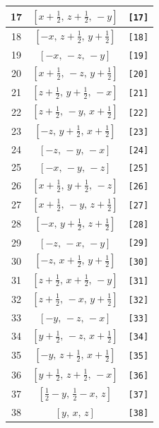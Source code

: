 \documentclass[fleqn,8pt]{jsarticle}
\begin{document}
\begin{longtable}{ccc}
17 & $\left[ x + \frac{1}{2},\, z + \frac{1}{2},\, - y \right]$ & {\tt [17]} \\ \hline
18 & $\left[ - x,\, z + \frac{1}{2},\, y + \frac{1}{2} \right]$ & {\tt [18]} \\ \hline
19 & $\left[ - x,\, - z,\, - y \right]$ & {\tt [19]} \\ \hline
20 & $\left[ x + \frac{1}{2},\, - z,\, y + \frac{1}{2} \right]$ & {\tt [20]} \\ \hline
21 & $\left[ z + \frac{1}{2},\, y + \frac{1}{2},\, - x \right]$ & {\tt [21]} \\ \hline
22 & $\left[ z + \frac{1}{2},\, - y,\, x + \frac{1}{2} \right]$ & {\tt [22]} \\ \hline
23 & $\left[ - z,\, y + \frac{1}{2},\, x + \frac{1}{2} \right]$ & {\tt [23]} \\ \hline
24 & $\left[ - z,\, - y,\, - x \right]$ & {\tt [24]} \\ \hline
25 & $\left[ - x,\, - y,\, - z \right]$ & {\tt [25]} \\ \hline
26 & $\left[ x + \frac{1}{2},\, y + \frac{1}{2},\, - z \right]$ & {\tt [26]} \\ \hline
27 & $\left[ x + \frac{1}{2},\, - y,\, z + \frac{1}{2} \right]$ & {\tt [27]} \\ \hline
28 & $\left[ - x,\, y + \frac{1}{2},\, z + \frac{1}{2} \right]$ & {\tt [28]} \\ \hline
29 & $\left[ - z,\, - x,\, - y \right]$ & {\tt [29]} \\ \hline
30 & $\left[ - z,\, x + \frac{1}{2},\, y + \frac{1}{2} \right]$ & {\tt [30]} \\ \hline
31 & $\left[ z + \frac{1}{2},\, x + \frac{1}{2},\, - y \right]$ & {\tt [31]} \\ \hline
32 & $\left[ z + \frac{1}{2},\, - x,\, y + \frac{1}{2} \right]$ & {\tt [32]} \\ \hline
33 & $\left[ - y,\, - z,\, - x \right]$ & {\tt [33]} \\ \hline
34 & $\left[ y + \frac{1}{2},\, - z,\, x + \frac{1}{2} \right]$ & {\tt [34]} \\ \hline
35 & $\left[ - y,\, z + \frac{1}{2},\, x + \frac{1}{2} \right]$ & {\tt [35]} \\ \hline
36 & $\left[ y + \frac{1}{2},\, z + \frac{1}{2},\, - x \right]$ & {\tt [36]} \\ \hline
37 & $\left[ \frac{1}{2} - y,\, \frac{1}{2} - x,\, z \right]$ & {\tt [37]} \\ \hline
38 & $\left[ y,\, x,\, z \right]$ & {\tt [38]} \\ \hline

\end{longtable}
\end{document}
